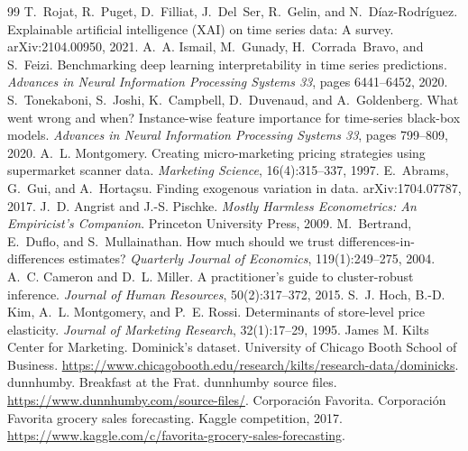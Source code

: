 \begin{thebibliography}{99}
 T.~Rojat, R.~Puget, D.~Filliat, J.~Del~Ser, R.~Gelin, and N.~D\'iaz-Rodr\'iguez. Explainable artificial intelligence (XAI) on time series data: A survey. arXiv:2104.00950, 2021.
 A.~A. Ismail, M.~Gunady, H.~Corrada~Bravo, and S.~Feizi. Benchmarking deep learning interpretability in time series predictions. \emph{Advances in Neural Information Processing Systems 33}, pages 6441--6452, 2020.
 S.~Tonekaboni, S.~Joshi, K.~Campbell, D.~Duvenaud, and A.~Goldenberg. What went wrong and when? Instance-wise feature importance for time-series black-box models. \emph{Advances in Neural Information Processing Systems 33}, pages 799--809, 2020.
 A.~L. Montgomery. Creating micro-marketing pricing strategies using supermarket scanner data. \emph{Marketing Science}, 16(4):315--337, 1997.
 E.~Abrams, G.~Gui, and A.~Horta\c{c}su. Finding exogenous variation in data. arXiv:1704.07787, 2017.
 J.~D. Angrist and J.-S. Pischke. \emph{Mostly Harmless Econometrics: An Empiricist's Companion}. Princeton University Press, 2009.
 M.~Bertrand, E.~Duflo, and S.~Mullainathan. How much should we trust differences-in-differences estimates? \emph{Quarterly Journal of Economics}, 119(1):249--275, 2004.
 A.~C. Cameron and D.~L. Miller. A practitioner's guide to cluster-robust inference. \emph{Journal of Human Resources}, 50(2):317--372, 2015.
 S.~J. Hoch, B.-D. Kim, A.~L. Montgomery, and P.~E. Rossi. Determinants of store-level price elasticity. \emph{Journal of Marketing Research}, 32(1):17--29, 1995.
 James M. Kilts Center for Marketing. Dominick's dataset. University of Chicago Booth School of Business. \url{https://www.chicagobooth.edu/research/kilts/research-data/dominicks}.
 dunnhumby. Breakfast at the Frat. dunnhumby source files. \url{https://www.dunnhumby.com/source-files/}.
 Corporaci\'on Favorita. Corporaci\'on Favorita grocery sales forecasting. Kaggle competition, 2017. \url{https://www.kaggle.com/c/favorita-grocery-sales-forecasting}.


\end{thebibliography}
